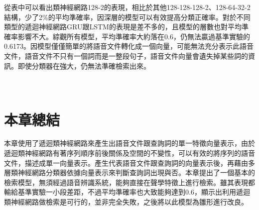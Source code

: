 從表中可以看出類神經網路128-2的表現，相比於其他128-128-128-2、128-64-32-2結構，少了2\%的平均準確率，因深層的模型可以有效提高分類正確率。對於不同類型的遞迴神經網路GRU跟LSTM的表現是差不多的，且模型的層數也對平均準確率影響不大。綜觀所有模型，平均準確率大約落在0.6，仍無法贏過基準實驗的0.6173。因模型僅僅簡單的將語音文件轉化成一個向量，可能無法充分表示此語音文件，語音文件不只有一個詞而是一整段句子，語音文件向量會遺失掉某些詞的資訊。即使分類器在強大，仍無法準確檢索出來。
\\
\\
\\

\section{本章總結}
本章使用了遞迴類神經網路來產生出語音文件跟查詢詞的單一特徵向量表示，由於遞迴類神經網路有著序列順序前後關係及空間的不變性，可以有效的將序列的語音文件，描述成單一向量表示。產生代表語音文件跟查詢詞的向量表示後，再藉由多層類神經網路分類器依據向量表示來判斷查詢詞出現與否。本章提出了一個基本的檢索模型，無須經過語音辨識系統，能夠直接在聲學特徵上進行檢索。雖其表現都輸給基準實驗一小段差距，不過平均準確率也大致能夠達到0.6，顯示出利用遞迴類神經網路做檢索是可行的，並非完全失敗，之後將以此模型為雛形進行改良。
